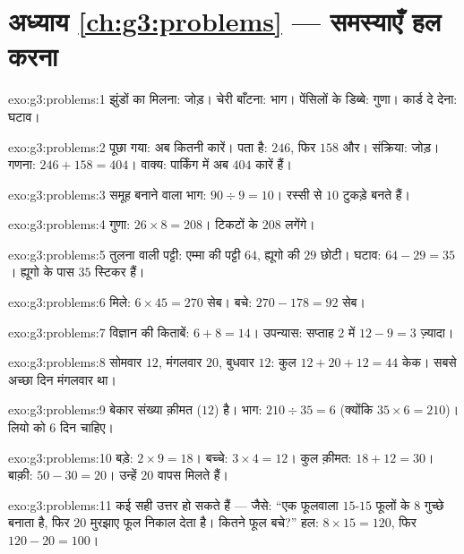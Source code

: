 \section*{अध्याय \ref{ch:g3:problems} --- समस्याएँ हल करना}

\begin{solution}{exo:g3:problems:1}
झुंडों का मिलना: जोड़। चेरी बाँटना: भाग। पेंसिलों के डिब्बे:
गुणा। कार्ड दे देना: घटाव।
\end{solution}

\begin{solution}{exo:g3:problems:2}
पूछा गया: अब कितनी कारें। पता है: $246$, फिर $158$ और।
संक्रिया: जोड़। गणना: $246 + 158 = 404$। वाक्य: पार्किंग में अब
$404$ कारें हैं।
\end{solution}

\begin{solution}{exo:g3:problems:3}
समूह बनाने वाला भाग: $90 \div 9 = 10$। रस्सी से $10$ टुकड़े बनते हैं।
\end{solution}

\begin{solution}{exo:g3:problems:4}
गुणा: $26 \times 8 = 208$। टिकटों के $208$ लगेंगे।
\end{solution}

\begin{solution}{exo:g3:problems:5}
तुलना वाली पट्टी: एम्मा की पट्टी $64$, ह्यूगो की $29$ छोटी।
घटाव: $64 - 29 = 35$। ह्यूगो के पास $35$ स्टिकर हैं।
\end{solution}

\begin{solution}{exo:g3:problems:6}
मिले: $6 \times 45 = 270$ सेब। बचे:
$270 - 178 = 92$ सेब।
\end{solution}

\begin{solution}{exo:g3:problems:7}
विज्ञान की किताबें: $6 + 8 = 14$। उपन्यास: सप्ताह 2 में $12 - 9 = 3$ ज़्यादा।
\end{solution}

\begin{solution}{exo:g3:problems:8}
सोमवार $12$, मंगलवार $20$, बुधवार $12$: कुल
$12 + 20 + 12 = 44$ केक। सबसे अच्छा दिन मंगलवार था।
\end{solution}

\begin{solution}{exo:g3:problems:9}
बेकार संख्या क़ीमत ($12$) है। भाग:
$210 \div 35 = 6$ (क्योंकि $35 \times 6 = 210$)। लियो को $6$ दिन चाहिए।
\end{solution}

\begin{solution}{exo:g3:problems:10}
बड़े: $2 \times 9 = 18$। बच्चे: $3 \times 4 = 12$। कुल क़ीमत:
$18 + 12 = 30$। बाक़ी: $50 - 30 = 20$। उन्हें $20$ वापस मिलते हैं।
\end{solution}

\begin{solution}{exo:g3:problems:11}
कई सही उत्तर हो सकते हैं --- जैसे: ``एक फूलवाला $15$-$15$ फूलों
के $8$ गुच्छे बनाता है, फिर $20$ मुरझाए फूल निकाल देता है। कितने
फूल बचे?'' हल: $8 \times 15 = 120$, फिर $120 - 20 = 100$।

\end{solution}
